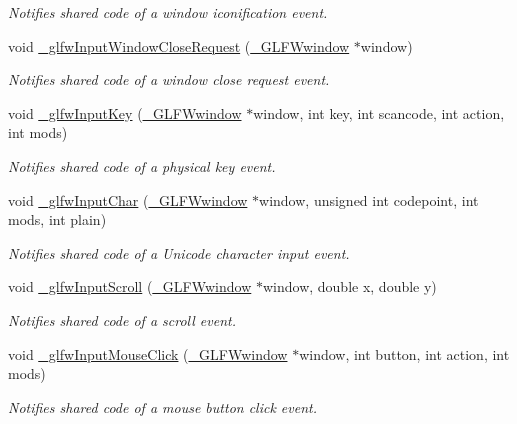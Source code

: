 \begin{DoxyCompactItemize}
\begin{DoxyCompactList}\small\item\em Notifies shared code of a window iconification event. \end{DoxyCompactList}\item 
void \hyperlink{group__event_gae47e309820934e21c92a3e60faeefe8e}{\+\_\+glfw\+Input\+Window\+Close\+Request} (\hyperlink{struct__GLFWwindow}{\+\_\+\+G\+L\+F\+Wwindow} $\ast$window)
\begin{DoxyCompactList}\small\item\em Notifies shared code of a window close request event. \end{DoxyCompactList}\item 
void \hyperlink{group__event_gaba4a5bf53c475cf2dc3e594c3c5034ab}{\+\_\+glfw\+Input\+Key} (\hyperlink{struct__GLFWwindow}{\+\_\+\+G\+L\+F\+Wwindow} $\ast$window, int key, int scancode, int action, int mods)
\begin{DoxyCompactList}\small\item\em Notifies shared code of a physical key event. \end{DoxyCompactList}\item 
void \hyperlink{group__event_gae3c27d97c2c4b7f52fbc68a218a23eb6}{\+\_\+glfw\+Input\+Char} (\hyperlink{struct__GLFWwindow}{\+\_\+\+G\+L\+F\+Wwindow} $\ast$window, unsigned int codepoint, int mods, int plain)
\begin{DoxyCompactList}\small\item\em Notifies shared code of a Unicode character input event. \end{DoxyCompactList}\item 
void \hyperlink{group__event_ga6e8a36d42050134a532c219a98d5d443}{\+\_\+glfw\+Input\+Scroll} (\hyperlink{struct__GLFWwindow}{\+\_\+\+G\+L\+F\+Wwindow} $\ast$window, double x, double y)
\begin{DoxyCompactList}\small\item\em Notifies shared code of a scroll event. \end{DoxyCompactList}\item 
void \hyperlink{group__event_gae259527976c9b13341aa3e4587d0353e}{\+\_\+glfw\+Input\+Mouse\+Click} (\hyperlink{struct__GLFWwindow}{\+\_\+\+G\+L\+F\+Wwindow} $\ast$window, int button, int action, int mods)
\begin{DoxyCompactList}\small\item\em Notifies shared code of a mouse button click event. \end{DoxyCompactList}\item 

\end{DoxyCompactItemize}

